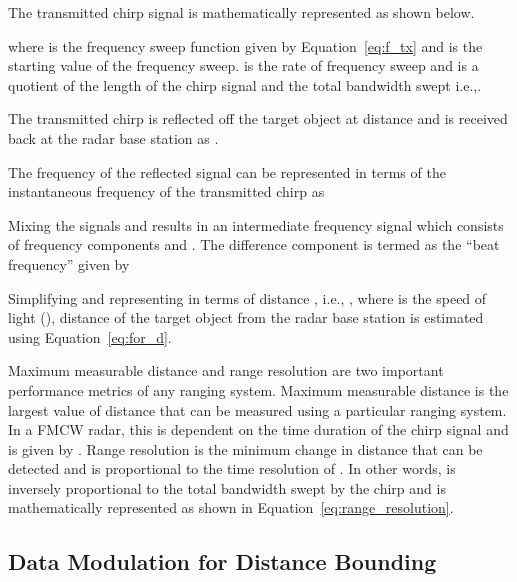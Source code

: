 \documentclass{sig-alternate-10pt}
\newcommand{\ie}{i.e.,\xspace}
\begin{document}
The transmitted chirp signal  is mathematically represented as
shown below.



where  is the frequency sweep function given by
Equation~\eqref{eq:f_tx} and  is the starting value of the frequency
sweep.  is the rate of frequency sweep and is a quotient of the length of
the chirp signal  and the total bandwidth  swept \ie .



The transmitted chirp is reflected off the target object at distance  and
is received back at the radar base station as .



The frequency of the reflected signal can be represented in terms of the
instantaneous frequency of the transmitted chirp as



Mixing the signals  and  results in an intermediate
frequency signal  which consists of
frequency components  and . The
difference component is termed as the ``beat frequency'' given by



Simplifying and representing  in terms of distance , \ie
, where  is the speed of light (),
distance of the target object from the radar base station is estimated using
Equation~\eqref{eq:for_d}.





Maximum measurable distance and range resolution are two important performance
metrics of any ranging system. Maximum measurable distance  is the largest
value of distance  that can be measured using a particular ranging system.
In a FMCW radar, this is dependent on the time duration  of the chirp signal
and is given by . Range resolution  is the minimum change in
distance that can be detected and is proportional to the time resolution of
. In other words,  is inversely proportional to the total
bandwidth swept by the chirp and is mathematically represented as shown in
Equation~\eqref{eq:range_resolution}.



\subsection{Data Modulation for Distance Bounding}
\label{subsec:ask-fmcw}
\end{document}
